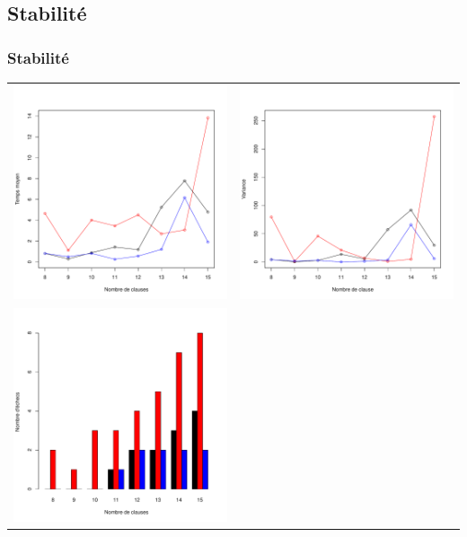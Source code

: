 \documentclass{beamer}
\begin{document}
\subsection{Stabilité}
\begin{frame}
    \frametitle{Stabilité}
    \begin{center}
        \begin{tabular}{cc}
            \includegraphics[width=0.35\linewidth]{data/mean.pdf} & \includegraphics[width=0.35\linewidth]{data/var.pdf} \\
            \includegraphics[width=0.35\linewidth]{data/runout.pdf} & \\
        \end{tabular}
    \end{center}
\end{frame}
\end{document}
